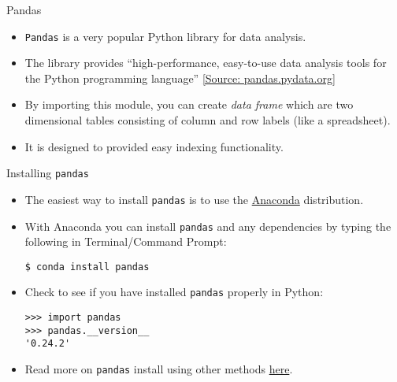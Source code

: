 \documentclass[xcolor=svgnames, colorlinks, handout]{beamer}
\newcommand{\pandas}{{\tt pandas}\xspace}
\begin{document}
\begin{frame}[fragile]{Pandas}
\begin{itemize}
\item  {\tt Pandas} is a  very popular Python library for data analysis. 
\vfill 
\item The library provides ``high-performance, easy-to-use data
analysis tools for the Python programming language'' \href{pandas.pydata.org}{[Source: pandas.pydata.org]}
\vfill 
\item By importing this module, you can create \emph{data frame} which are two dimensional tables consisting of column and row labels (like a spreadsheet).
\vfill
\item It is designed to provided easy indexing functionality. 
\vfill
\end{itemize}
\end{frame}


\begin{frame}[fragile]{Installing {\tt pandas}}
\begin{itemize}
\item The easiest way to install \pandas is  to use the \href{https://www.anaconda.com/distribution/}{Anaconda} distribution.
\vfill
\item With Anaconda you can install \pandas and any dependencies by typing the following in Terminal/Command Prompt:
\begin{Verbatim}[frame=single]
$ conda install pandas
\end{Verbatim}
\vfill
\item Check to see if you have installed \pandas properly in Python:
\begin{Verbatim}[frame=single]
>>> import pandas
>>> pandas.__version__
'0.24.2'
\end{Verbatim}
\vfill
\item Read more on \pandas install using other methods \href{https://pandas.pydata.org/pandas-docs/stable/install.html}{here}.
\vfill
\end{itemize}
\end{frame}
\end{document}

